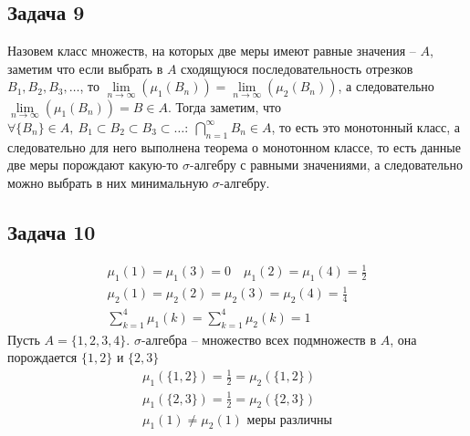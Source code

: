 \subsection*{Задача 9}
	Назовем класс множеств, на которых две меры имеют равные значения -- $A$, заметим что если выбрать в $A$ сходящуюся последовательность отрезков $B_1, B_2, B_3, \ldots$, то $\lim\limits_{n \to \infty}(\mu_1(B_n)) = \lim\limits_{n \to \infty}(\mu_2(B_n))$, а следовательно $\lim\limits_{n \to \infty}(\mu_1(B_n)) = B \in A$. Тогда заметим, что $\forall \{B_n\} \in A,\ B_1 \subset B_2 \subset B_3 \subset \ldots:\ \bigcap\limits_{n=1}^{\infty} B_n \in A$, то есть это монотонный класс, а следовательно для него выполнена теорема о монотонном классе, то есть данные две меры порождают какую-то $\sigma$-алгебру с равными значениями, а следовательно можно выбрать в них минимальную $\sigma$-алгебру.


\subsection*{Задача 10}
	\begin{gather*}
		\mu_1(1) = \mu_1(3) = 0\quad \mu_1(2) = \mu_1(4) = \frac{1}{2}\\
		\mu_2(1) = \mu_2(2) = \mu_2(3) = \mu_2(4) = \frac{1}{4}\\
		\sum\limits_{k=1}^{4} \mu_1(k) = \sum\limits_{k=1}^{4} \mu_2(k) = 1
	\end{gather*}
	Пусть $A = \{1,2,3,4\}$. $\sigma$-алгебра -- множество всех подмножеств в $A$, она порождается $\{1,2\}$ и $\{2,3\}$
	\begin{gather*}
		\mu_1(\{1,2\}) = \frac{1}{2} = \mu_2(\{1,2\})\\
		\mu_1(\{2,3\}) = \frac{1}{2} = \mu_2(\{2,3\})\\
		\mu_1(1) \ne \mu_2(1) \text{ меры различны}
	\end{gather*}
	

